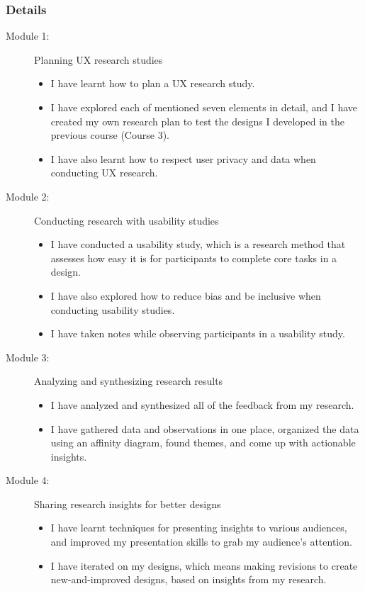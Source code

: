 \subsubsection{Details}
\begin{flushleft}
	\begin{description}
		\item[Module 1:] Planning UX research studies
		      \begin{itemize}
			      \item I have learnt how to plan a UX research study.
			      \item I have explored each of mentioned seven elements in detail, and I have created my own research plan to test the designs I developed in the previous course (Course 3).
			      \item I have also learnt how to respect user privacy and data when conducting UX research.
		      \end{itemize}
		\item[Module 2:] Conducting research with usability studies
		      \begin{itemize}
			      \item I have conducted a usability study, which is a research method that assesses how easy it is for participants to complete core tasks in a design.
			      \item I have also explored how to reduce bias and be inclusive when conducting usability studies.
			      \item I have taken notes while observing participants in a usability study.
		      \end{itemize}
		\item[Module 3:] Analyzing and synthesizing research results
		      \begin{itemize}
			      \item I have analyzed and synthesized all of the feedback from my research.
			      \item I have gathered data and observations in one place, organized the data using an affinity diagram, found themes, and come up with actionable insights.
		      \end{itemize}
		\item[Module 4:] Sharing research insights for better designs
		      \begin{itemize}
			      \item I have learnt techniques for presenting insights to various audiences, and improved my presentation skills to grab my audience's attention.
			      \item I have iterated on my designs, which means making revisions to create new-and-improved designs, based on insights from my research.
		      \end{itemize}
	\end{description}
\end{flushleft}